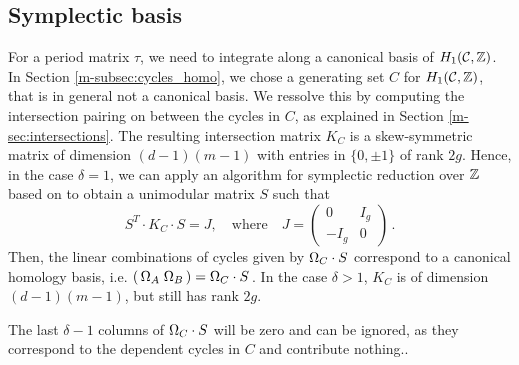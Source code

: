\documentclass[main.tex]{subfiles}
\begin{document}

  \subsection{Symplectic basis}\label{subsec:symp_basis}
  
  For a period matrix $\tau$, we need to integrate along a canonical basis of $H_1(\mathcal{C},\mathbb{Z})$. In Section \ref{m-subsec:cycles_homo}, we chose a generating set $C$ for $H_1(\mathcal{C},\mathbb{Z})$, that is in general not 
  a canonical basis. \abstand We 
  ressolve this by computing the intersection pairing on between the cycles in $C$, as explained in Section \ref{m-sec:intersections}. The resulting intersection matrix $K_C$
   is a skew-symmetric matrix of dimension $(d-1)(m-1)$ with entries in $\{ 0,\pm 1\}$ of rank $2g$. Hence, in the case $\delta = 1$, we can apply an algorithm 
  for symplectic reduction over $\mathbb{Z}$ based on
    \cite[Theorem 18]{KB2002} to obtain a unimodular matrix $S$ such that
  $$S^T \cdot K_C \cdot S = J, \quad \text{where} \quad J = \begin{pmatrix} 0 & I_g \\ -I_g & 0 \end{pmatrix}\,.$$
  Then, the linear combinations of cycles given by $\Omega_C \cdot S$ correspond to a canonical homology basis, i.e. $( \, \Omega_A \; \Omega_B \, ) = \Omega_C \cdot S$\,.
  In the case $\delta > 1$, $K_C$ is of dimension $(d-1)(m-1)$, but still has rank $2g$. 
  
  The last $\delta-1$ columns of $\Omega_C \cdot S$ will be zero and can be ignored, as they correspond to the dependent cycles
  in $C$ and contribute nothing..
  
 
\biblio
\end{document}
